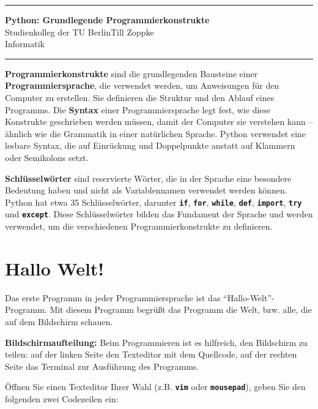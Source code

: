 \documentclass[ngerman,11pt]{article}
\date{\DTMgermanmonthname{\month} \the\year}
\begin{document}
\hrule
\begin{center}
{\large\bf Python: Grundlegende Programmierkonstrukte}\\[-0mm]
Studienkolleg der TU Berlin\hfill Till Zoppke\\
\makeatletter Informatik \hfill \@date\\[2mm] \makeatother
\end{center}
\hrule
\par\bigskip
\noindent \textbf{Programmierkonstrukte} sind die grundlegenden Bausteine einer \textbf{Programmiersprache}, die verwendet werden, um Anweisungen für den Computer zu erstellen. Sie definieren die Struktur und den Ablauf eines Programms. Die \textbf{Syntax} einer Programmiersprache legt fest, wie diese Konstrukte geschrieben werden müssen, damit der Computer sie verstehen kann -- ähnlich wie die Grammatik in einer natürlichen Sprache. Python verwendet eine lesbare Syntax, die auf Einrückung und Doppelpunkte anstatt auf Klammern oder Semikolons setzt.

\textbf{Schlüsselwörter} sind reservierte Wörter, die in der Sprache eine besondere Bedeutung haben und nicht als Variablennamen verwendet werden können. Python hat etwa 35 Schlüsselwörter, darunter \textbf{\texttt{if}}, \textbf{\texttt{for}}, \textbf{\texttt{while}}, \textbf{\texttt{def}}, \textbf{\texttt{import}}, \textbf{\texttt{try}} und \textbf{\texttt{except}}. Diese Schlüsselwörter bilden das Fundament der Sprache und werden verwendet, um die verschiedenen Programmierkonstrukte zu definieren.

\section{Hallo Welt!}

Das erste Programm in jeder Programmiersprache ist das ``Hallo-Welt''-Programm. Mit diesem Programm begrüßt das Programm die Welt, bzw. alle, die auf dem Bildschirm schauen.

\textbf{Bildschirmaufteilung:} Beim Programmieren ist es hilfreich, den Bildschirm zu teilen: auf der linken Seite den Texteditor mit dem Quellcode, auf der rechten Seite das Terminal zur Ausführung des Programms.


Öffnen Sie einen Texteditor Ihrer Wahl (z.B. \textbf{\texttt{vim}} oder \textbf{\texttt{mousepad}}), geben Sie den folgenden zwei Codezeilen ein:
\end{document}
